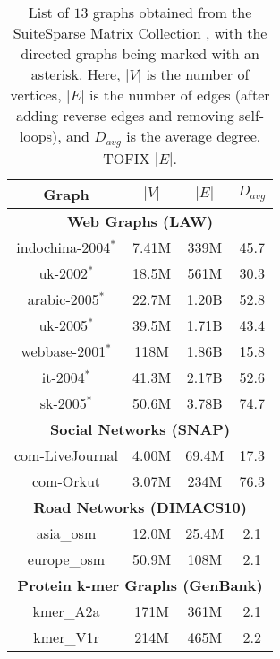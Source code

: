 \begin{table}[hbtp]
  \centering
  \caption{List of $13$ graphs obtained from the SuiteSparse Matrix Collection \cite{suite19}, with the directed graphs being marked with an asterisk. Here, $|V|$ is the number of vertices, $|E|$ is the number of edges (after adding reverse edges and removing self-loops), and $D_{avg}$ is the average degree. TOFIX $|E|$.}
  \label{tab:dataset}
  \begin{tabular}{|c||c|c|c|}
    \toprule
    \textbf{Graph} &
    \textbf{\textbf{$|V|$}} &
    \textbf{\textbf{$|E|$}} &
    \textbf{\textbf{$D_{avg}$}} \\
    \midrule
    \multicolumn{4}{|c|}{\textbf{Web Graphs (LAW)}} \\ \hline
    indochina-2004$^*$ & 7.41M & 339M & 45.7 \\ \hline
    uk-2002$^*$ & 18.5M & 561M & 30.3 \\ \hline
    arabic-2005$^*$ & 22.7M & 1.20B & 52.8 \\ \hline
    uk-2005$^*$ & 39.5M & 1.71B & 43.4 \\ \hline
    webbase-2001$^*$ & 118M & 1.86B & 15.8 \\ \hline
    it-2004$^*$ & 41.3M & 2.17B & 52.6 \\ \hline
    sk-2005$^*$ & 50.6M & 3.78B & 74.7 \\ \hline
    \multicolumn{4}{|c|}{\textbf{Social Networks (SNAP)}} \\ \hline
    com-LiveJournal & 4.00M & 69.4M & 17.3 \\ \hline
    com-Orkut & 3.07M & 234M & 76.3 \\ \hline
    \multicolumn{4}{|c|}{\textbf{Road Networks (DIMACS10)}} \\ \hline
    asia\_osm & 12.0M & 25.4M & 2.1 \\ \hline
    europe\_osm & 50.9M & 108M & 2.1 \\ \hline
    \multicolumn{4}{|c|}{\textbf{Protein k-mer Graphs (GenBank)}} \\ \hline
    kmer\_A2a & 171M & 361M & 2.1 \\ \hline
    kmer\_V1r & 214M & 465M & 2.2 \\ \hline
  \bottomrule
  \end{tabular}
\end{table}
